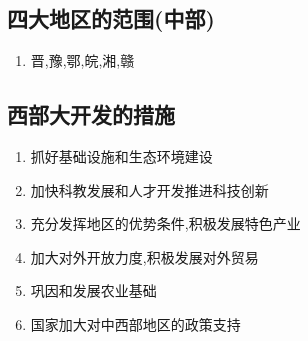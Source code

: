 \documentclass[a4paper]{article}
\begin{document}
    \subsection{四大地区的范围(中部)}
    \begin{enumerate}
        \item 晋,豫,鄂,皖,湘,赣
    \end{enumerate}
    \subsection{西部大开发的措施}
    \begin{enumerate}
        \item 抓好基础设施和生态环境建设
        \item 加快科教发展和人才开发推进科技创新
        \item 充分发挥地区的优势条件,积极发展特色产业
        \item 加大对外开放力度,积极发展对外贸易
        \item 巩因和发展农业基础
        \item 国家加大对中西部地区的政策支持
    \end{enumerate}
\end{document}
